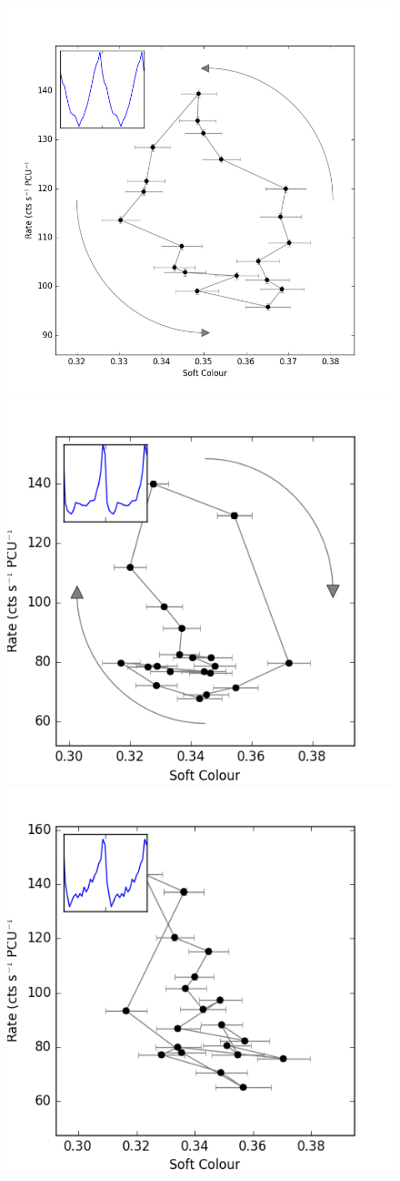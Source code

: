\begin{figure}
    \includegraphics[width=\columnwidth, trim = 0mm 0mm 0mm 0mm]{images/Jloop.png}\\
    \includegraphics[width=0.5\columnwidth, trim = 0mm 0mm 0mm 0mm]{images/Jloop4.png}\includegraphics[width=0.5\columnwidth, trim = 0mm 0mm 0mm 0mm]{images/Jloop3.png}

\end{figure}
